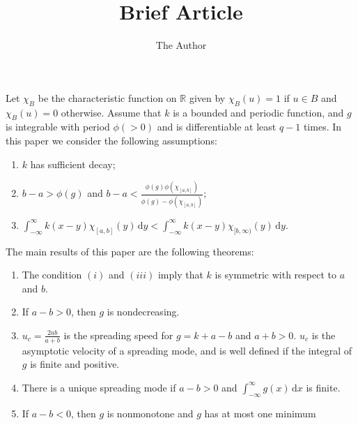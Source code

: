\documentclass[11pt]{article} %
\title{Brief Article}
\author{The Author}
\theoremstyle{definition}
\numberwithin{equation}{section}
\numberwithin{thm}{section}
\renewcommand{\a}{a}
\renewcommand{\b}{b}
\begin{document}
\maketitle


Let $\chi_B$ be the characteristic function on $\mathbb{R}$ given by $\chi_B(u)=1$ if $u\in B$ and $\chi_B(u)=0$ otherwise. Assume that $k$ is a bounded and periodic function, and 
$g$ is integrable with period $\phi(>0)$ and is differentiable at least $q-1$ times. In this paper we consider the following assumptions:

\begin{enumerate}
\item $k$ has sufficient decay;
\item $\b-\a>\phi(g)$ and $\b-\a<\frac{\phi(g)\phi(\chi_{[\a,\b]})}{\phi(g)-\phi(\chi_{[\a,\b]})};$
\item $\int^{\infty}_{-\infty}k(x-y)\chi_{[\a,\b]}(y)\,\mathrm{d}y<\int^{\infty}_{-\infty}k(x-y)\chi_{[\b,\infty)}(y)\,\mathrm{d}y$.
\end{enumerate}

The main results of this paper are the following theorems:

\begin{enumerate}
\item The condition $(i)$ and $(iii)$ imply that $k$ is symmetric with respect to $\a$ and $\b$.
\item If $\a-\b>0$, then $g$ is nondecreasing.
\item $u_c=\frac{2\a\b}{\a+\b}$ is the spreading speed for  $g=k+\a-\b$ and $\a+\b>0$. 
$u_c$ is the asymptotic velocity of a spreading mode, and is well defined if the integral of $g$ is finite and positive.
\item There is a unique spreading mode if $\a-\b>0$ and $\int^{\infty}_{-\infty}g(x)\,\mathrm{d}x$ is finite.
\item If $\a-\b<0$, then $g$ is nonmonotone and $g$ has at most one minimum
\end{enumerate}
\end{document}
